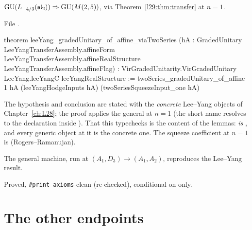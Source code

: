 \begin{theorem}\label{l29:thm:leeyang}
$\mathrm{GU}(L_{-4/3}(\mathfrak{sl}_2))\Rightarrow\mathrm{GU}(M(2,5))$, via Theorem~\ref{l29:thm:transfer} at $n=1$.
\end{theorem}

\noindent File .
\begin{leancode}
theorem leeYang_gradedUnitary_of_affine_viaTwoSeries
    (hA : GradedUnitary LeeYangTransferAssembly.affineForm
      LeeYangTransferAssembly.affineRealStructure LeeYangTransferAssembly.affineFlag) :
    VirGradedUnitarity.VirGradedUnitary LeeYang.leeYangC leeYangRealStructure :=
  twoSeries_gradedUnitary_of_affine 1 hA (leeYangHodgeInputs hA) (twoSeriesSqueezeInput_one hA)
\end{leancode}

\begin{dictionary}
The hypothesis and conclusion are stated with the \emph{concrete} Lee--Yang objects of Chapter~\ref{ch:L28}; the proof
applies the general  at $n=1$ (the short name resolves to the
 declaration inside ). That this typechecks is the content of the
 lemmas:  \emph{is} , and every generic object at it is the concrete
one. The squeeze coefficient at $n=1$ is  (Rogers--Ramanujan).
\end{dictionary}

\begin{physics}
The general machine, run at $(A_1,D_3)\to(A_1,A_2)$, reproduces the Lee--Yang result.
\end{physics}

\begin{status}
Proved, \texttt{\#print axioms}-clean (re-checked), conditional on  only.
\end{status}

\section{The other endpoints}\label{l29:sec:endpointstable}

